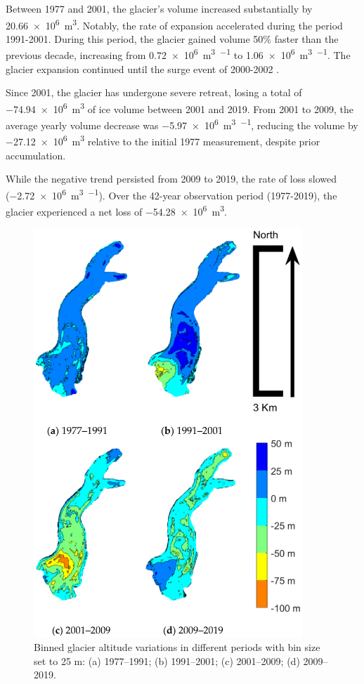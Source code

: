 Between 1977 and 2001, the glacier's volume increased substantially by \SI[retain-explicit-plus]{+20.66e6}{\cubic\meter}.
Notably, the rate of expansion accelerated during the period 1991-2001.
During this period, the glacier gained volume 50\% faster than the previous decade, increasing from \SI[retain-explicit-plus]{+0.72e6}{\cubic\meter\per\year} to \SI[retain-explicit-plus]{+1.06e6}{\cubic\meter\per\year}.
The glacier expansion continued until the surge event of 2000-2002 \citep{Haeberli2002, Kaab2004, Mortara2009}.

Since 2001, the glacier has undergone severe retreat, losing a total of \SI{-74.94e6}{\cubic\meter} of ice volume between 2001 and 2019.
From 2001 to 2009, the average yearly volume decrease was \SI{-5.97e6}{\cubic\meter\per\year}, reducing the volume by \SI{-27.12e6}{\cubic\meter} relative to the initial 1977 measurement, despite prior accumulation.

While the negative trend persisted from 2009 to 2019, the rate of loss slowed (\SI{-2.72e6}{\cubic\meter\per\year}).
Over the 42-year observation period (1977-2019), the glacier experienced a net loss of \SI{-54.28e6}{\cubic\meter}.

\begin{figure}
    \centering
    \includegraphics[width=0.9\textwidth]{results_volumes_variations.png}
    \caption{Binned glacier altitude variations in different periods with bin size set to 25 m: (a) 1977–1991; (b) 1991–2001; (c) 2001–2009; (d) 2009–2019. }
    \label{fig:2:volume_variations}
\end{figure}

